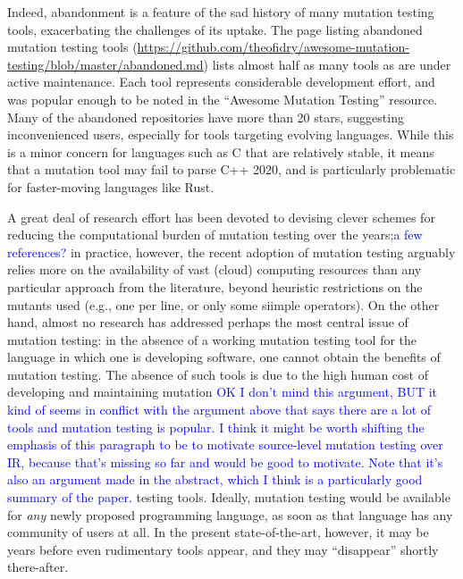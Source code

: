 \documentclass[sigconf,review, anonymous]{acmart}
\newcommand{\clg}[1]{\textcolor{blue}{#1}}
\begin{document}
Indeed, abandonment is a feature of the sad history
of many mutation testing tools, exacerbating the challenges of its uptake.  The page listing abandoned
mutation testing tools
(\url{https://github.com/theofidry/awesome-mutation-testing/blob/master/abandoned.md})
lists almost half as many tools as are under active maintenance. Each tool represents 
considerable development effort, and was
popular enough to be noted in the ``Awesome
Mutation Testing'' resource. Many of the abandoned repositories have more than
20 stars, suggesting inconvenienced users, especially for tools targeting
evolving languages. While this is a minor concern for languages such as C
that are relatively stable, it means that a mutation tool may fail
to parse C++ 2020, and is particularly problematic for 
faster-moving languages like Rust.

A great deal of research effort has been devoted to devising clever
schemes for reducing the computational burden of mutation testing over
the years;\clg{a few references?} in practice, however, the recent adoption of mutation
testing arguably relies more on the availability of vast (cloud) computing
resources than any particular approach from the literature, beyond
heuristic restrictions on the mutants used (e.g., one per line, or
only some siimple operators).   On the other hand, almost no
research has addressed perhaps the most central issue of
mutation testing: in the absence of a working mutation testing
tool for the language in which one is developing software, one cannot
obtain the benefits of mutation testing.  The absence of such tools is
due to the high human cost of developing and maintaining mutation
\clg{OK I don't mind this argument, BUT it kind of seems in conflict with the
  argument above that says there are a lot of tools and mutation testing is
  popular.  I think it might be worth shifting the emphasis of this paragraph to
  be to motivate source-level mutation testing over IR, because that's missing
  so far and would be good to motivate.  Note that it's also an argument made in
  the abstract, which I think is a particularly good summary of the paper.}
testing tools.  Ideally, mutation testing would be available for
\emph{any} newly proposed programming language, as soon as that
language has any community of users at all.  In the present
state-of-the-art, however, it may be years before even rudimentary
tools appear, and they may ``disappear'' shortly there-after.
\end{document}
